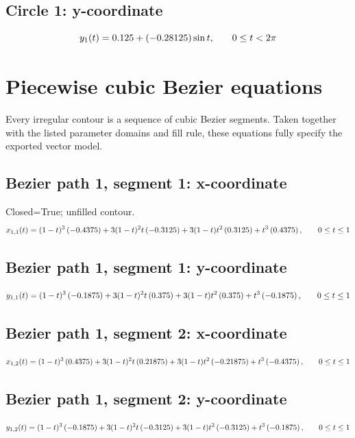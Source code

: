 \documentclass[10pt]{article}
\begin{document}
\subsection*{Circle 1: y-coordinate}
\begin{equation*}
\small
y_{1}(t)=0.125+\left(-0.28125\right)\sin t,\qquad 0\le t<2\pi
\end{equation*}
\section{Piecewise cubic Bezier equations}
Every irregular contour is a sequence of cubic Bezier segments. Taken together with the listed parameter domains and fill rule, these equations fully specify the exported vector model.
\subsection*{Bezier path 1, segment 1: x-coordinate}
Closed=True; unfilled contour.
\begin{equation*}
\small
x_{1,1}(t)=(1-t)^3\left(-0.4375\right)+3(1-t)^2t\left(-0.3125\right)+3(1-t)t^2\left(0.3125\right)+t^3\left(0.4375\right),\qquad 0\le t\le 1
\end{equation*}
\subsection*{Bezier path 1, segment 1: y-coordinate}
\begin{equation*}
\small
y_{1,1}(t)=(1-t)^3\left(-0.1875\right)+3(1-t)^2t\left(0.375\right)+3(1-t)t^2\left(0.375\right)+t^3\left(-0.1875\right),\qquad 0\le t\le 1
\end{equation*}
\subsection*{Bezier path 1, segment 2: x-coordinate}
\begin{equation*}
\small
x_{1,2}(t)=(1-t)^3\left(0.4375\right)+3(1-t)^2t\left(0.21875\right)+3(1-t)t^2\left(-0.21875\right)+t^3\left(-0.4375\right),\qquad 0\le t\le 1
\end{equation*}
\subsection*{Bezier path 1, segment 2: y-coordinate}
\begin{equation*}
\small
y_{1,2}(t)=(1-t)^3\left(-0.1875\right)+3(1-t)^2t\left(-0.3125\right)+3(1-t)t^2\left(-0.3125\right)+t^3\left(-0.1875\right),\qquad 0\le t\le 1
\end{equation*}
\end{document}
